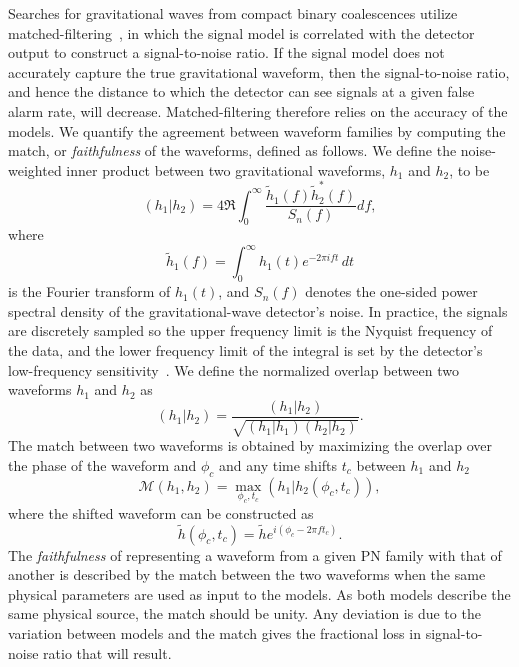 Searches for gravitational waves from compact binary coalescences utilize
matched-filtering~\cite{Wainstein,Allen:2005fk}, in which the signal model is
correlated with the detector output to construct a signal-to-noise
ratio. If the signal model does not accurately capture the true gravitational
waveform, then the signal-to-noise ratio, and hence the distance to which the
detector can see signals at a given false alarm rate, will decrease. Matched-filtering 
therefore relies on the accuracy of the models. We quantify the 
agreement between waveform families by computing the match, or
\emph{faithfulness} of the waveforms, defined as follows.
We 
define the noise-weighted inner product between two gravitational waveforms, $h_1$ and
$h_2$, to be
%
\begin{equation}
%
(h_1|h_2) = 4 \Re{
\int_{0}^{\infty}\dfrac{\tilde{h}_1(f)\tilde{h}_2^*(f)}{S_n(f)} df},
%
\end{equation}
%
where 
\begin{equation}
\tilde{h}_1(f) = \int_0^\infty h_1(t) e^{-2\pi i ft} \, dt
\end{equation}
is the Fourier transform of $h_1(t)$, and $S_n(f)$ denotes the one-sided power spectral
density of the gravitational-wave detector's noise. In practice, the signals are discretely sampled so the upper
frequency limit is the Nyquist frequency of the data,
and the lower frequency limit of the integral is set by the detector's
low-frequency sensitivity~\cite{Allen:2005fk}. We define the normalized overlap between two
waveforms $h_1$ and $h_2$ as
%
\begin{equation}
%
(h_1|h_2) = \dfrac{(h_1|h_2)}{\sqrt{(h_1|h_1)(h_2|h_2)}}.
%
\end{equation}
%
The match between two waveforms is obtained by maximizing the overlap over the phase of the waveform and $\phi_c$ and any time shifts $t_c$ between
$h_1$ and $h_2$
%
\begin{equation}\label{eq:match}
%
\mathcal{M}(h_1,h_2) = \underset{\phi_c,t_c}{\max} (h_1|h_2(\phi_c,t_c)),
%
\end{equation}
%
where the shifted waveform can be constructed as
%
\begin{equation}
%
\tilde{h}(\phi_c,t_c) = \tilde{h} e^{i\left(\phi_c - 2 \pi f t_c \right)}.
%
\end{equation}
The \emph{faithfulness} of representing a waveform from a given \ac{PN} family with
that of another is described by the match between the two waveforms when the
same physical parameters are used as input to the models. As both models
describe the same physical source, the match should be unity. Any deviation is
due to the variation between models and the match gives the fractional loss in
signal-to-noise ratio that will result.


